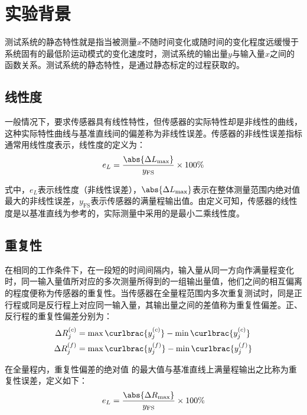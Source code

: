 \documentclass[a4paper,10.5pt,twoside]{article}%
\begin{document}
\newpage



\setcounter{page}{1}

\section{实验背景}
测试系统的静态特性就是指当被测量$x$不随时间变化或随时间的变化程度远缓慢于系统固有的最低阶运动模式的变化速度时，测试系统的输出量$y$与输入量$x$之间的函数关系。测试系统的静态特性，是通过静态标定的过程获取的。
\subsection{线性度}
一般情况下，要求传感器具有线性特性，但传感器的实际特性却是非线性的曲线，这种实际特性曲线与基准直线间的偏差称为非线性误差。传感器的非线性误差指标通常用线性度表示，线性度的定义为：
\begin{equation*}
  e_L= \frac{\abs{\Delta L_\mathrm{max}}}{y_\mathrm{FS}} \times 100\%
\end{equation*}\par
式中，$e_L$表示线性度（非线性误差），$\abs{\Delta L_\mathrm{max}}$表示在整体测量范围内绝对值最大的非线性误差，$y_\mathrm{FS}$表示传感器的满量程输出值。由定义可知，传感器的线性度是以基准直线为参考的，实际测量中采用的是最小二乘线性度。
\subsection{重复性}
在相同的工作条件下，在一段短的时间间隔内，输入量从同一方向作满量程变化时，同一输入量值所对应的多次测量所得到的一组输出量值，他们之间的相互偏离的程度便称为传感器的重复性。当传感器在全量程范围内多次重复测试时，同是正行程或同是反行程上对应同一输入量，其输出量之间的差值称为重复性偏差。正、反行程的重复性偏差分别为：
\begin{align*}
  \Delta R^{(c)}_j &= \max\curlbrac{y_j^{(c)}} - \min\curlbrac{y_j^{(c)}}\\
  \Delta R^{(f)}_j &= \max\curlbrac{y_j^{(f)}} - \min\curlbrac{y_j^{(f)}}
\end{align*}\par
在全量程内，重复性偏差的绝对值 的最大值与基准直线上满量程输出之比称为重复性误差，定义如下：
\begin{equation*}
  e_L= \frac{\abs{\Delta R_\mathrm{max}}}{y_\mathrm{FS}} \times 100\%
\end{equation*}\par
\newpage
\end{document}
